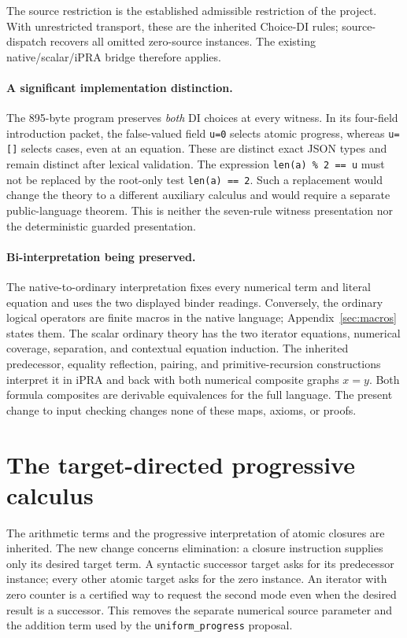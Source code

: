 \documentclass[11pt,a4paper]{article}
\theoremstyle{definition}\newtheorem{definition}[theorem]{Definition}
\begin{document}
The source restriction is the established admissible restriction of
the project. With unrestricted transport, these are the inherited
Choice-DI rules; source-dispatch recovers all omitted zero-source
instances. The existing native/scalar/iPRA bridge therefore applies.
\cite{readme,source,choice,bridge}

\paragraph{A significant implementation distinction.}
The 895-byte program preserves \emph{both} DI choices at every witness.
In its four-field introduction packet, the false-valued field
\texttt{u=0} selects atomic progress, whereas \texttt{u=[]} selects
cases, even at an equation. These are distinct exact JSON types and
remain distinct after lexical validation. The expression
\texttt{len(a) \% 2 == u} must not be replaced by the root-only test
\texttt{len(a) == 2}. Such a replacement would change the theory to a
different auxiliary calculus and would require a separate public-language
theorem. This is neither the seven-rule witness presentation nor the
deterministic guarded presentation.

\paragraph{Bi-interpretation being preserved.}
The native-to-ordinary interpretation fixes every numerical term and
literal equation and uses the two displayed binder readings. Conversely,
the ordinary logical operators are finite macros in the native language;
Appendix~\ref{sec:macros} states them. The scalar ordinary theory has the
two iterator equations, numerical coverage, separation, and contextual
equation induction. The inherited predecessor, equality reflection,
pairing, and primitive-recursion constructions interpret it in iPRA and
back with both numerical composite graphs $x=y$. Both formula composites
are derivable equivalences for the full language. The present change to
input checking changes none of these maps, axioms, or proofs.


\section{The target-directed progressive calculus}
\label{target:section}

The arithmetic terms and the progressive interpretation of atomic closures
are inherited.  The new change concerns elimination: a closure instruction
supplies only its desired target term.  A syntactic successor target asks for
its predecessor instance; every other atomic target asks for the zero
instance.  An iterator with zero counter is a certified way to request the
second mode even when the desired result is a successor.  This removes the
separate numerical source parameter and the addition term used by the
\texttt{uniform\_progress} proposal.
\end{document}
